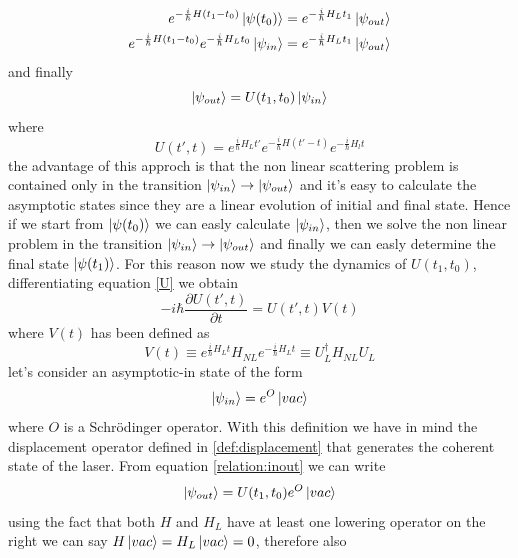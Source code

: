 \documentclass[12pt]{book}
\begin{document}
\begin{equation}
\begin{split}
e^{-\frac{i}{\hbar}H (t_1-t_0)}\ket{\psi(t_0)} = e^{-\frac{i}{\hbar}H_L t_1}\ket{\psi_{out}} \\
e^{-\frac{i}{\hbar}H (t_1-t_0)}e^{-\frac{i}{\hbar}H_Lt_0}\ket{\psi_{in}} = e^{-\frac{i}{\hbar}H_L t_1}\ket{\psi_{out}}
\end{split}
\end{equation}
and finally
\begin{equation}\label{relation:inout}\ket{\psi_{out}} = U(t_1,t_0) \ket{\psi_{in}}\end{equation}
where 
\begin{equation}\label{U}
U(t',t) = e^{\frac{i}{\hbar}H_Lt'}e^{-\frac{i}{\hbar}H(t'-t)}e^{-\frac{i}{\hbar}H_lt}
\end{equation}
the advantage of this approch is that the non linear scattering problem is contained only in the transition $\ket{\psi_{in}} \to \ket{\psi_{out}}$ and it's easy to calculate the asymptotic states since they are a linear evolution of initial and final state. Hence if we start from $\ket{\psi(t_0)}$ we can easly calculate $\ket{\psi_{in}}$, then we solve the non linear problem in the transition $\ket{\psi_{in}} \to \ket{\psi_{out}}$ and finally we can easly determine the final state $\ket{\psi(t_1)}$. For this reason now we study the dynamics of $U(t_1,t_0)$, differentiating equation \eqref{U} we obtain
\begin{equation}\label{dynamicU}-i\hbar \frac{\partial U(t',t)}{\partial t} = U(t',t)V(t)\end{equation}
where $V(t)$ has been defined as
\begin{equation}V(t) \equiv  e^{\frac{i}{\hbar}H_Lt}H_{NL}e^{-\frac{i}{\hbar}H_Lt} \equiv U_L^\dagger H_{NL} U_L\end{equation}
let's consider an asymptotic-in state of the form 
\begin{equation}\ket{\psi_{in}} = e^O \ket{vac}\end{equation}
where $O$ is a Schr{\"o}dinger operator. With this definition we have in mind the displacement operator defined in \eqref{def:displacement} that generates the coherent state of the laser. From equation \eqref{relation:inout} we can write
\begin{equation}\label{outfinal}\ket{\psi_{out}} = U(t_1,t_0)e^O \ket{vac}\end{equation}
using the fact that both $H$ and $H_L$ have at least one lowering operator on the right we can say $H\ket{vac} = H_L\ket{vac} = 0$, therefore also
\end{document}
